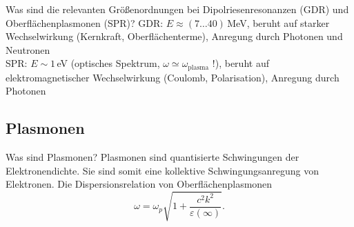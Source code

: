 
\begin{fquestion}{Was sind die relevanten Größenordnungen bei Dipolriesenresonanzen (GDR) und Oberflächenplasmonen (SPR)?}
   GDR: $E\approx (7\dots 40)\,$MeV, beruht auf starker Wechselwirkung (Kernkraft, Oberflächenterme), Anregung durch Photonen und Neutronen %
   \\
   SPR: $E\sim 1\,$eV (optisches Spektrum, $\omega \simeq \omega_\mathrm{plasma}$ !), beruht auf elektromagnetischer Wechselwirkung (Coulomb, Polarisation), Anregung durch Photonen
\end{fquestion}

\subsection{Plasmonen}

\begin{fquestion}{Was sind Plasmonen?}
    Plasmonen sind quantisierte Schwingungen der Elektronendichte. 
    Sie sind somit eine kollektive Schwingungsanregung von Elektronen. 
    Die Dispersionsrelation von Oberflächenplasmonen
    \[\omega = \omega_p \sqrt{1 + \frac{c^2k^2}{\varepsilon(\infty)}}.\]
    
    \begin{center}
    \end{center}
\end{fquestion}

